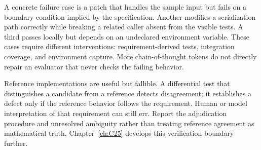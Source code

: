 A concrete failure case is a patch that handles the sample input but fails on a boundary condition implied by the specification. Another modifies a serialization path correctly while breaking a related caller absent from the visible tests. A third passes locally but depends on an undeclared environment variable. These cases require different interventions: requirement-derived tests, integration coverage, and environment capture. More chain-of-thought tokens do not directly repair an evaluator that never checks the failing behavior.

Reference implementations are useful but fallible. A differential test that distinguishes a candidate from a reference detects disagreement; it establishes a defect only if the reference behavior follows the requirement. Human or model interpretation of that requirement can still err. Report the adjudication procedure and unresolved ambiguity rather than treating reference agreement as mathematical truth. Chapter~\ref{ch:C25} develops this verification boundary further.

